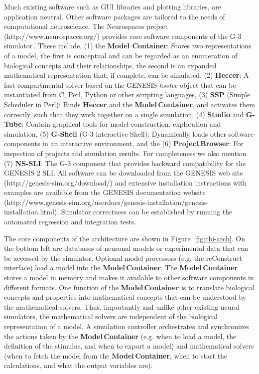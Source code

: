 \documentclass[12pt]{article}
\begin{document}
Much existing software such as GUI libraries and plotting libraries,
are application neutral.  Other software packages are tailored to the
needs of computational neuroscience.  The Neurospaces project
(http://www.neurospaces.org/) provides core software components of the
G-3 simulator\,\cite{cornelis03:_neuros}. These include, (1) the {\bf
  Model Container}: Stores two representations of a model, the first
is conceptual and can be regarded as an enumeration of biological
concepts and their relationships, the second is an expanded
mathematical representation that, if complete, can be simulated, (2)
{\bf Heccer}: A fast compartmental solver based on the GENESIS {\it
  hsolve} object that can be instantiated from C, Perl, Python or
other scripting languages, (3) {\bf SSP} (Simple Scheduler in Perl):
Binds {\bf Heccer} and the {\bf Model\,Container}, and activates them
correctly, such that they work together on a single simulation, (4)
{\bf Studio} and {\bf G-Tube}: Contain graphical tools for model
construction, exploration and simulation, (5) {\bf G-Shell} (G-3
interactive Shell): Dynamically loads other software components in an
interactive environment, and the (6) {\bf Project\,Browser}: For
inspection of projects and simulation results. For completeness we
also mention (7) {\bf NS-SLI}: The G-3 component that provides
backward compatibility for the GENESIS 2 SLI. All software can be
downloaded from the GENESIS web site
(http://genesis-sim.org/download/) and extensive installation
instructions with examples are available from the GENESIS
documentation website
(http://www.genesis-sim.org/userdocs/genesis-installation/genesis-installation.html).
Simulator correctness can be established by running the automated
regression and integration tests.

The core components of the architecture are shown in
Figure~\ref{fig:cbi-arch}. On the bottom left are databases of
neuronal models or experimental data that can be accessed by the
simulator. Optional model processors (e.g. the reConstruct interface)
load a model into the {\bf Model\,Container}.  The {\bf
  Model\,Container} stores a model in memory and makes it available to
other software components in different formats.  One function of the
{\bf Model\,Container} is to translate biological concepts and
properties into mathematical concepts that can be understood by the
mathematical solvers. Thus, importantly and unlike other existing
neural simulators, the mathematical solvers are independent of the
biological representation of a model. A simulation controller
orchestrates and synchronizes the actions taken by the {\bf
  Model\,Container} (e.g. when to load a model, the definition of the
stimulus, and when to export a model) and mathematical solvers (when
to fetch the model from the {\bf Model\,Container}, when to start the
calculations, and what the output variables are).
\end{document}

